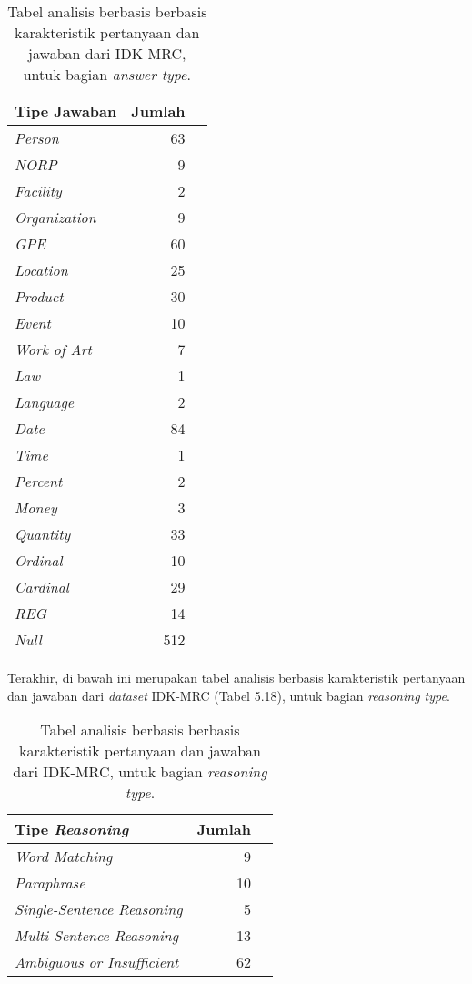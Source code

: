 \begin{table}[H]\centering
\begin{tabular}{lrr}\toprule
Tipe Jawaban &Jumlah \\\midrule
\emph{Person} &  63\\
\emph{NORP} &  9\\
\emph{Facility} &  2\\
\emph{Organization} & 9\\
\emph{GPE} &  60\\
\emph{Location} & 25\\
\emph{Product} &  30\\
\emph{Event} &  10\\

\emph{Work of Art} & 7\\
\emph{Law} &  1\\
\emph{Language} &  2\\
\emph{Date} & 84\\
\emph{Time} &  1\\
\emph{Percent} & 2\\
\emph{Money} &  3\\
\emph{Quantity} &  33\\

\emph{Ordinal} &  10\\
\emph{Cardinal} &  29\\
\emph{REG} &  14\\
\emph{Null} &  512\\
\bottomrule
\end{tabular}
\caption{Tabel analisis berbasis berbasis karakteristik pertanyaan dan jawaban dari IDK-MRC, untuk bagian \emph{answer type}.}
\end{table}

Terakhir, di bawah ini merupakan tabel analisis berbasis karakteristik pertanyaan dan jawaban dari \emph{dataset} IDK-MRC (Tabel 5.18), untuk bagian \emph{reasoning type}.

\begin{table}[H]\centering
\begin{tabular}{lrr}\toprule
Tipe \emph{Reasoning} &Jumlah \\\midrule
\emph{Word Matching} & 9\\
\emph{Paraphrase} & 10\\
\emph{Single-Sentence Reasoning} & 5\\
\emph{Multi-Sentence Reasoning} & 13\\
\emph{Ambiguous or Insufficient} & 62\\
\bottomrule
\end{tabular}
\caption{Tabel analisis berbasis berbasis karakteristik pertanyaan dan jawaban dari IDK-MRC, untuk bagian \emph{reasoning type}.}
\end{table}

